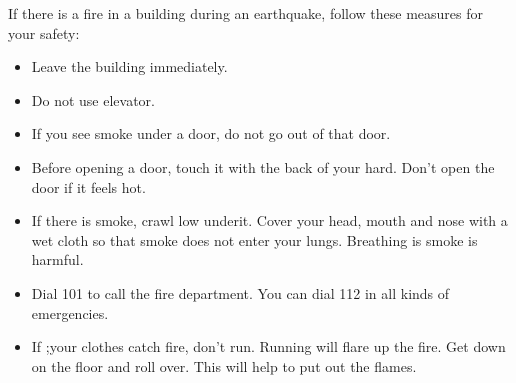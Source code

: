 If there is a fire in a building during an earthquake, follow these measures for your safety:
\begin{itemize}
    \item Leave the building immediately.
    \item Do not use elevator.
    \vspace{0.4in}
    \item If you see smoke under a door, do not go out of that door. 
    \item Before opening a door, touch it with the back of your hard. Don't open the door if it feels hot.
    \item If there is smoke, crawl low underit. Cover your head, mouth and nose with a wet cloth so that smoke does not enter your lungs. Breathing is smoke is harmful.
    \item Dial 101 to call the fire department. You can dial 112 in all kinds of emergencies.
    \item If ;your clothes catch fire, don't run. Running will flare up the fire. Get down on the floor and roll over. This will help to put out the flames.
\end{itemize}
\vspace{1.8in}
